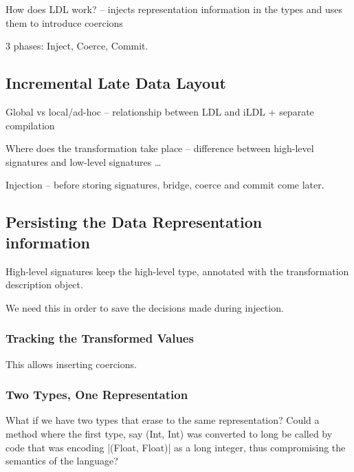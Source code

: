 How does LDL work? -- injects representation information in the types and uses them to introduce coercions

3 phases: Inject, Coerce, Commit.




\subsection{Incremental Late Data Layout}

Global vs local/ad-hoc -- relationship between LDL and iLDL + separate compilation

Where does the transformation take place -- difference between high-level signatures and low-level signatures \ldots

Injection -- before storing signatures, bridge, coerce and commit come later.

\subsection{Persisting the Data Representation information}
\label{sec:ildl:signatures}

High-level signatures keep the high-level type, annotated with the transformation description object.

We need this in order to save the decisions made during injection.

\subsubsection{Tracking the Transformed Values}
This allows inserting coercions.

\subsubsection{Two Types, One Representation}

What if we have two types that erase to the same representation? Could a method where the first type, say (Int, Int) was converted to long be called by code that was encoding |(Float, Float)| as a long integer, thus compromising the semantics of the language?

